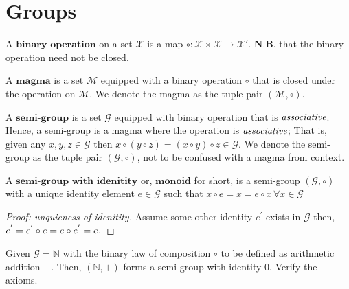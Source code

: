 
\section{Groups} %
\label{sec:groups}

\begin{defn}
 A $\textbf{binary operation}$ on a set $\mathcal{X}$ is a map
 $\circ : \mathcal{X} \times \mathcal{X} \to \mathcal{X}'$.
 $\textbf{N.B.}$ that the binary operation need not be closed.
\end{defn}

\begin{defn}[Magma]
 A $\textbf{magma}$ is a set $\mathcal{M}$ equipped with a binary operation $\circ$ that is closed
 under the operation on $\mathcal{M}$. We denote the magma as the tuple pair $(\mathcal{M}, \circ)$.
\end{defn}


\begin{defn}
 A $\textbf{semi-group}$ is a set $\mathcal{G}$ equipped with binary operation that is $\emph{associative}$.
 Hence, a semi-group is a magma where the operation is $\emph{associative}$;
 That is, given any $x,y,z \in \mathcal{G}$ then $x \circ (y \circ z) = (x \circ y) \circ z \in \mathcal{G}$.
 We denote the semi-group as the tuple pair $(\mathcal{G}, \circ)$, not to be confused with a magma from context.
\end{defn}

\begin{defn}[Monoid]
 A $\textbf{semi-group with idenitity}$ or, $\textbf{monoid}$ for short, is a semi-group $(\mathcal{G}, \circ)$
 with a unique identity element $e \in \mathcal{G}$ such that $x \circ e = x = e \circ x \, \forall x \in \mathcal{G}$
\end{defn}


\begin{proof}[Proof: unquieness of idenitity]
 Assume some other identity $e^{'}$ exists in $\mathcal{G}$ then, $e^{'} = e^{'} \circ e = e \circ e^{'} = e. \qedhere$
\end{proof}


\begin{exmp}
 Given $\mathcal{G} = \mathbb{N}$ with the binary law of composition $\circ$ to be defined as arithmetic addition $+$.
 Then, $(\mathbb{N}, +)$ forms a semi-group with identity $0$. Verify the axioms.
\end{exmp}


